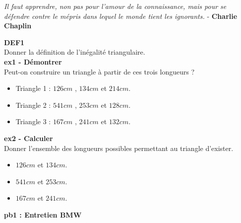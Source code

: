 



\begin{center}
  \textit{Il faut apprendre, non pas pour l'amour de la connaissance, mais pour se défendre contre le mépris dans lequel le monde tient les ignorants.} - \textbf{Charlie Chaplin}
\end{center}

\textbf{DEF1} \\

Donner la définition de l'inégalité triangulaire.\\

\textbf{ex1 - Démontrer} \\

Peut-on construire un triangle à partir de ces trois longueurs ? 

\begin{itemize}[label={$\bullet$}]
  \item Triangle 1 : $126cm$ , $134cm$  et $214cm$.
  \item Triangle 2 : $541cm$ , $253cm$ et $128cm$.
  \item Triangle 3 : $167cm$ , $241cm$ et $132cm$.
\end{itemize} 

\textbf{ex2 - Calculer} \\

Donner l'ensemble des longueurs possibles permettant au triangle d'exister. 

\begin{itemize}[label={$\bullet$}]
  \item $126cm$ et $134cm$.
  \item $541cm$ et $253cm$.
  \item $167cm$ et $241cm$.
\end{itemize}

\textbf{pb1 : Entretien BMW} \\

